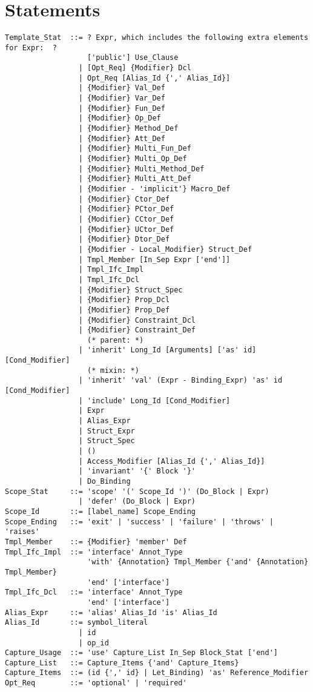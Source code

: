 \section{Statements}
\label{sec:statements}

\grammar\begin{lstlisting}[deletekeywords={for}]
Template_Stat  ::= ? Expr, which includes the following extra elements for Expr:  ?
                   ['public'] Use_Clause
                 | [Opt_Req] {Modifier} Dcl
                 | Opt_Req [Alias_Id {',' Alias_Id}]
                 | {Modifier} Val_Def
                 | {Modifier} Var_Def
                 | {Modifier} Fun_Def
                 | {Modifier} Op_Def
                 | {Modifier} Method_Def
                 | {Modifier} Att_Def
                 | {Modifier} Multi_Fun_Def
                 | {Modifier} Multi_Op_Def
                 | {Modifier} Multi_Method_Def
                 | {Modifier} Multi_Att_Def
                 | {Modifier - 'implicit'} Macro_Def
                 | {Modifier} Ctor_Def
                 | {Modifier} PCtor_Def
                 | {Modifier} CCtor_Def
                 | {Modifier} UCtor_Def
                 | {Modifier} Dtor_Def
                 | {Modifier - Local_Modifier} Struct_Def
                 | Tmpl_Member [In_Sep Expr ['end']]
                 | Tmpl_Ifc_Impl
                 | Tmpl_Ifc_Dcl
                 | {Modifier} Struct_Spec
                 | {Modifier} Prop_Dcl
                 | {Modifier} Prop_Def
                 | {Modifier} Constraint_Dcl
                 | {Modifier} Constraint_Def
                   (* parent: *)
                 | 'inherit' Long_Id [Arguments] ['as' id] [Cond_Modifier]
                   (* mixin: *)
                 | 'inherit' 'val' (Expr - Binding_Expr) 'as' id [Cond_Modifier]
                 | 'include' Long_Id [Cond_Modifier]
                 | Expr
                 | Alias_Expr
                 | Struct_Expr
                 | Struct_Spec
                 | ()
                 | Access_Modifier [Alias_Id {',' Alias_Id}]
                 | 'invariant' '{' Block '}'
                 | Do_Binding
Scope_Stat     ::= 'scope' '(' Scope_Id ')' (Do_Block | Expr)
                 | 'defer' (Do_Block | Expr)
Scope_Id       ::= [label_name] Scope_Ending
Scope_Ending   ::= 'exit' | 'success' | 'failure' | 'throws' | 'raises'
Tmpl_Member    ::= {Modifier} 'member' Def
Tmpl_Ifc_Impl  ::= 'interface' Annot_Type
                   'with' {Annotation} Tmpl_Member {'and' {Annotation} Tmpl_Member} 
                   'end' ['interface']
Tmpl_Ifc_Dcl   ::= 'interface' Annot_Type 
                   'end' ['interface']
Alias_Expr     ::= 'alias' Alias_Id 'is' Alias_Id
Alias_Id       ::= symbol_literal
                 | id
                 | op_id
Capture_Usage  ::= 'use' Capture_List In_Sep Block_Stat ['end']
Capture_List   ::= Capture_Items {'and' Capture_Items}
Capture_Items  ::= (id {',' id} | Let_Binding) 'as' Reference_Modifier
Opt_Req        ::= 'optional' | 'required'
\end{lstlisting}

